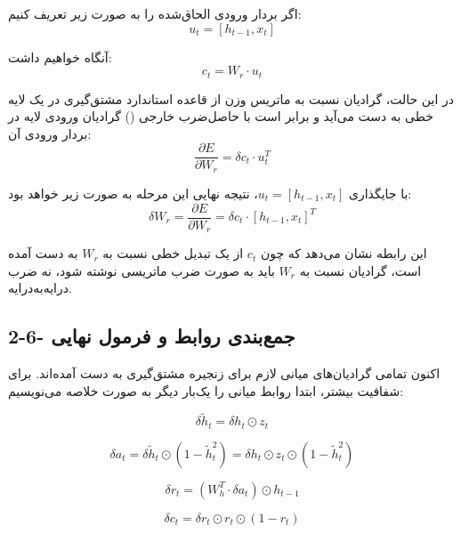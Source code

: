 \documentclass{article}
\begin{document}
اگر بردار ورودی الحاق‌شده را به صورت زیر تعریف کنیم:
\begin{equation}
	u_t=[h_{t-1},x_t]
\end{equation}

آنگاه خواهیم داشت:
\begin{equation}
	c_t=W_r\cdot u_t
\end{equation}

در این حالت، گرادیان نسبت به ماتریس وزن از قاعده استاندارد مشتق‌گیری در یک لایه خطی به دست می‌آید و برابر است با حاصل‌ضرب خارجی () گرادیان ورودی لایه در بردار ورودی آن:
\begin{equation}
	\frac{\partial E}{\partial W_r}=\delta c_t\cdot u_t^T
\end{equation}

با جایگذاری $u_t=[h_{t-1},x_t]$، نتیجه نهایی این مرحله به صورت زیر خواهد بود:
\begin{equation}
	\delta W_r=\frac{\partial E}{\partial W_r}=\delta c_t\cdot [h_{t-1},x_t]^T
\end{equation}

این رابطه نشان می‌دهد که چون $c_t$ از یک تبدیل خطی نسبت به $W_r$ به دست آمده است، گرادیان نسبت به $W_r$ باید به صورت ضرب ماتریسی نوشته شود، نه ضرب درایه‌به‌درایه.

\subsection{2-6- جمع‌بندی روابط و فرمول نهایی}

اکنون تمامی گرادیان‌های میانی لازم برای زنجیره مشتق‌گیری به دست آمده‌اند.  
برای شفافیت بیشتر، ابتدا روابط میانی را یک‌بار دیگر به صورت خلاصه می‌نویسیم:

\begin{equation}
	\delta \widetilde{h}_t=\delta h_t\odot z_t
\end{equation}

\begin{equation}
	\delta a_t=\delta \widetilde{h}_t\odot(1-\widetilde{h}_t^2)
	=
	\delta h_t\odot z_t\odot(1-\widetilde{h}_t^2)
\end{equation}

\begin{equation}
	\delta r_t=(W_h^T\cdot \delta a_t)\odot h_{t-1}
\end{equation}

\begin{equation}
	\delta c_t=\delta r_t\odot r_t\odot(1-r_t)
\end{equation}
\end{document}
